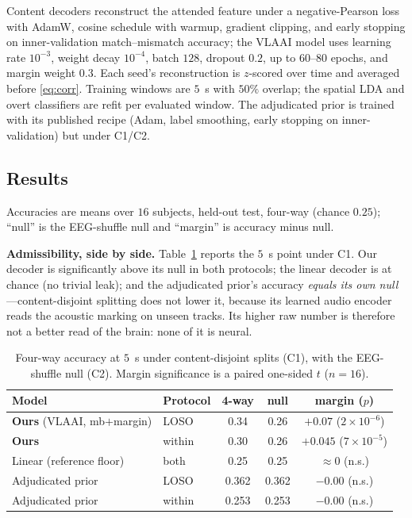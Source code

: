 \documentclass[journal]{IEEEtran}
\newcommand{\chance}{0.25}
\begin{document}
Content decoders reconstruct the attended feature under a negative-Pearson loss with
AdamW, cosine schedule with warmup, gradient clipping, and early stopping on
inner-validation match--mismatch accuracy; the VLAAI model uses learning rate
$10^{-3}$, weight decay $10^{-4}$, batch $128$, dropout $0.2$, up to $60$--$80$
epochs, and margin weight $0.3$. Each seed's reconstruction is $z$-scored over time
and averaged before \eqref{eq:corr}. Training windows are $5$~s with $50\%$ overlap;
the spatial LDA and overt classifiers are refit per evaluated window. The adjudicated
prior is trained with its published recipe (Adam, label smoothing, early stopping on
inner-validation) but under C1/C2.

\subsection{Results}
\label{sec:bench-results}

Accuracies are means over $16$ subjects, held-out test, four-way (chance $\chance$);
``null'' is the EEG-shuffle null and ``margin'' is accuracy minus null.

\textbf{Admissibility, side by side.} Table~\ref{tab:adjud} reports the $5$~s point
under C1. Our decoder is significantly above its null in both protocols; the linear
decoder is at chance (no trivial leak); and the adjudicated prior's accuracy
\emph{equals its own null}---content-disjoint splitting does not lower it, because
its learned audio encoder reads the acoustic marking on unseen tracks. Its higher raw
number is therefore not a better read of the brain: none of it is neural.

\begin{table}[t]
\centering
\caption{Four-way accuracy at $5$~s under content-disjoint splits (C1), with the
EEG-shuffle null (C2). Margin significance is a paired one-sided $t$ ($n{=}16$).}
\label{tab:adjud}
\small
\begin{tabular}{@{}llccc@{}}
\toprule
Model & Protocol & 4-way & null & margin ($p$) \\
\midrule
\textbf{Ours} (VLAAI, mb$+$margin) & LOSO   & 0.34 & 0.26 & $+0.07$ ($2\!\times\!10^{-6}$) \\
\textbf{Ours}                       & within & 0.30 & 0.26 & $+0.045$ ($7\!\times\!10^{-5}$) \\
Linear (reference floor)            & both   & 0.25 & 0.25 & $\approx 0$ (n.s.) \\
Adjudicated prior \cite{maestro}    & LOSO   & 0.362 & 0.362 & $-0.00$ (n.s.) \\
Adjudicated prior                   & within & 0.253 & 0.253 & $-0.00$ (n.s.) \\
\bottomrule
\end{tabular}
\end{table}
\end{document}
